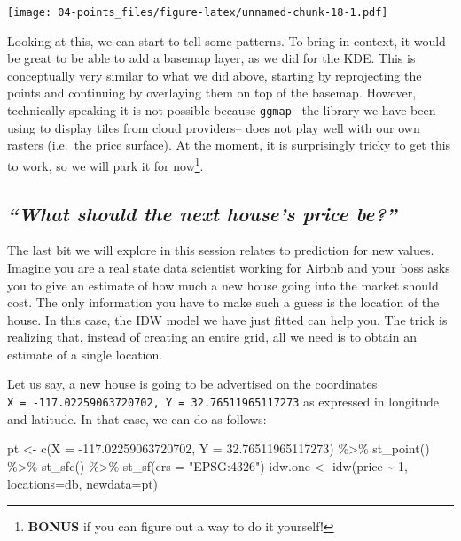 \documentclass[
]{book}
\newenvironment{Shaded}{\begin{snugshade}}{\end{snugshade}}
\newcommand{\AttributeTok}[1]{\textcolor[rgb]{0.77,0.63,0.00}{#1}}
\newcommand{\DecValTok}[1]{\textcolor[rgb]{0.00,0.00,0.81}{#1}}
\newcommand{\FloatTok}[1]{\textcolor[rgb]{0.00,0.00,0.81}{#1}}
\newcommand{\FunctionTok}[1]{\textcolor[rgb]{0.00,0.00,0.00}{#1}}
\newcommand{\NormalTok}[1]{#1}
\newcommand{\OtherTok}[1]{\textcolor[rgb]{0.56,0.35,0.01}{#1}}
\newcommand{\SpecialCharTok}[1]{\textcolor[rgb]{0.00,0.00,0.00}{#1}}
\newcommand{\StringTok}[1]{\textcolor[rgb]{0.31,0.60,0.02}{#1}}
\begin{document}
\texttt{[image: 04-points\_files/figure-latex/unnamed-chunk-18-1.pdf]}

Looking at this, we can start to tell some patterns. To bring in context, it would be great to be able to add a basemap layer, as we did for the KDE. This is conceptually very similar to what we did above, starting by reprojecting the points and continuing by overlaying them on top of the basemap. However, technically speaking it is not possible because \texttt{ggmap} --the library we have been using to display tiles from cloud providers-- does not play well with our own rasters (i.e.~the price surface). At the moment, it is surprisingly tricky to get this to work, so we will park it for now\footnote{\textbf{BONUS} if you can figure out a way to do it yourself!}.

\hypertarget{what-should-the-next-houses-price-be}{%
\subsection{\texorpdfstring{\emph{``What should the next house's price be?''}}{``What should the next house's price be?''}}\label{what-should-the-next-houses-price-be}}

The last bit we will explore in this session relates to prediction for new values. Imagine you are a real state data scientist working for Airbnb and your boss asks you to give an estimate of how much a new house going into the market should cost. The only information you have to make such a guess is the location of the house. In this case, the IDW model we have just fitted can help you. The trick is realizing that, instead of creating an entire grid, all we need is to obtain an estimate of a single location.

Let us say, a new house is going to be advertised on the coordinates \texttt{X\ =\ -117.02259063720702,\ Y\ =\ 32.76511965117273} as expressed in longitude and latitude. In that case, we can do as follows:

\begin{Shaded}
\begin{Highlighting}[]
\NormalTok{pt }\OtherTok{\textless{}{-}} \FunctionTok{c}\NormalTok{(}\AttributeTok{X =} \SpecialCharTok{{-}}\FloatTok{117.02259063720702}\NormalTok{, }\AttributeTok{Y =} \FloatTok{32.76511965117273}\NormalTok{) }\SpecialCharTok{\%\textgreater{}\%}
  \FunctionTok{st\_point}\NormalTok{() }\SpecialCharTok{\%\textgreater{}\%}
  \FunctionTok{st\_sfc}\NormalTok{() }\SpecialCharTok{\%\textgreater{}\%}
  \FunctionTok{st\_sf}\NormalTok{(}\AttributeTok{crs =} \StringTok{"EPSG:4326"}\NormalTok{)}
\NormalTok{idw.one }\OtherTok{\textless{}{-}} \FunctionTok{idw}\NormalTok{(price }\SpecialCharTok{\textasciitilde{}} \DecValTok{1}\NormalTok{, }\AttributeTok{locations=}\NormalTok{db, }\AttributeTok{newdata=}\NormalTok{pt)}
\end{Highlighting}
\end{Shaded}
\end{document}
